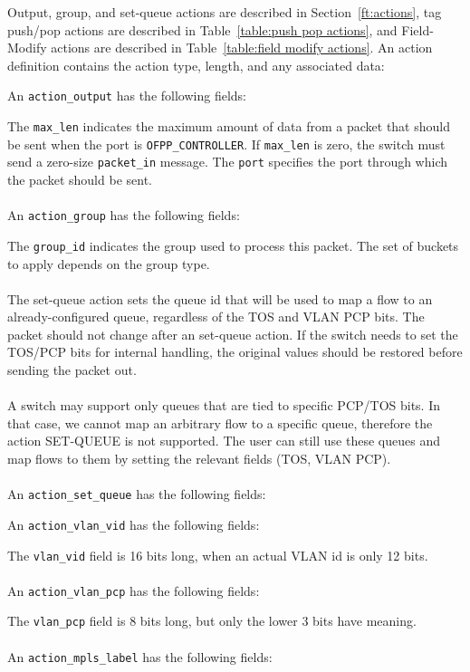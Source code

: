  
Output, group, and set-queue actions are described in Section~\ref{ft:actions}, tag push/pop actions are described in Table~\ref{table:push pop actions}, and Field-Modify actions are described in Table~\ref{table:field modify actions}.  An action definition contains the action type, length, and any associated data:


An \verb|action_output| has the following fields:


The \verb|max_len| indicates the maximum amount of data from a packet that should be sent when the port is \verb|OFPP_CONTROLLER|.  If \verb|max_len| is zero, the switch must send a zero-size \verb|packet_in| message.  The \verb|port| specifies the port through which the packet should be sent.
\\\\
An \verb|action_group| has the following fields:


The \verb|group_id| indicates the group used to process this packet.  The set of buckets to apply depends on the group type.
\\\\
The set-queue action sets the queue id that will be used to map a flow to an already-configured queue, regardless of the TOS and VLAN PCP bits.
  The packet should not change after an set-queue action. If the switch
  needs to set the TOS/PCP bits for internal handling, the original values
  should be restored before sending the packet out.
\\\\
A switch may support only queues that are tied to specific PCP/TOS
bits. In that case, we cannot map an arbitrary flow to a specific
queue, therefore the action SET-QUEUE is not supported. The user can
still use these queues and map
flows to them by setting the relevant fields (TOS, VLAN PCP).
\\\\
An \verb|action_set_queue| has the following fields:


An \verb|action_vlan_vid| has the following fields:


The \verb|vlan_vid| field is 16 bits long, when an actual VLAN id is only 12 bits.
\\\\
An \verb|action_vlan_pcp| has the following fields:


The \verb|vlan_pcp| field is 8 bits long, but only the lower 3 bits have meaning.  
\\\\
An \verb|action_mpls_label| has the following fields:

